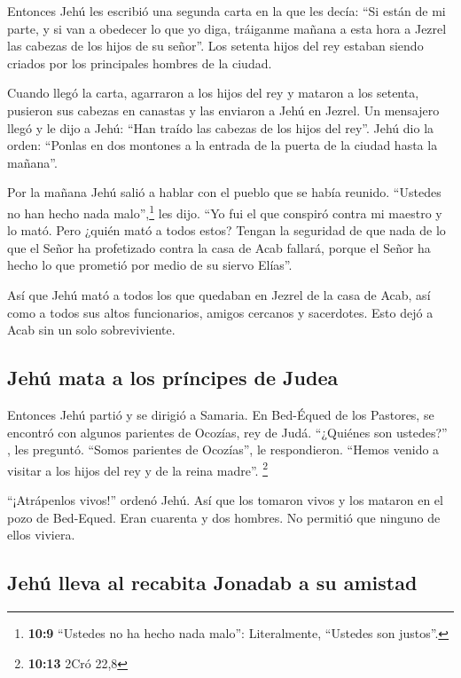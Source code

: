  Entonces Jehú les escribió una segunda carta en la que
les decía: ``Si están de mi parte, y si van a obedecer lo que yo diga,
tráiganme mañana a esta hora a Jezrel las cabezas de los hijos de su
señor''. Los setenta hijos del rey estaban siendo criados por los
principales hombres de la ciudad.

 Cuando llegó la carta, agarraron a los hijos del rey y
mataron a los setenta, pusieron sus cabezas en canastas y las enviaron a
Jehú en Jezrel.  Un mensajero llegó y le dijo a Jehú:
``Han traído las cabezas de los hijos del rey''. Jehú dio la orden:
``Ponlas en dos montones a la entrada de la puerta de la ciudad hasta la
mañana''.

 Por la mañana Jehú salió a hablar con el pueblo que se
había reunido. ``Ustedes no han hecho nada malo'',\footnote{\textbf{10:9}
  ``Ustedes no ha hecho nada malo'': Literalmente, ``Ustedes son
  justos''.} les dijo. ``Yo fui el que conspiró contra mi maestro y lo
mató. Pero ¿quién mató a todos estos?  Tengan la
seguridad de que nada de lo que el Señor ha profetizado contra la casa
de Acab fallará, porque el Señor ha hecho lo que prometió por medio de
su siervo Elías''.

 Así que Jehú mató a todos los que quedaban en Jezrel de
la casa de Acab, así como a todos sus altos funcionarios, amigos
cercanos y sacerdotes. Esto dejó a Acab sin un solo sobreviviente.

\hypertarget{jehuxfa-mata-a-los-pruxedncipes-de-judea}{%
\subsection{Jehú mata a los príncipes de
Judea}\label{jehuxfa-mata-a-los-pruxedncipes-de-judea}}

 Entonces Jehú partió y se dirigió a Samaria. En
Bed-Équed de los Pastores,  se encontró con algunos
parientes de Ocozías, rey de Judá. ``¿Quiénes son ustedes?'' , les
preguntó. ``Somos parientes de Ocozías'', le respondieron. ``Hemos
venido a visitar a los hijos del rey y de la reina madre''. \footnote{\textbf{10:13}
  2Cró 22,8}

 ``¡Atrápenlos vivos!'' ordenó Jehú. Así que los tomaron
vivos y los mataron en el pozo de Bed-Equed. Eran cuarenta y dos
hombres. No permitió que ninguno de ellos viviera.

\hypertarget{jehuxfa-lleva-al-recabita-jonadab-a-su-amistad}{%
\subsection{Jehú lleva al recabita Jonadab a su
amistad}\label{jehuxfa-lleva-al-recabita-jonadab-a-su-amistad}}

